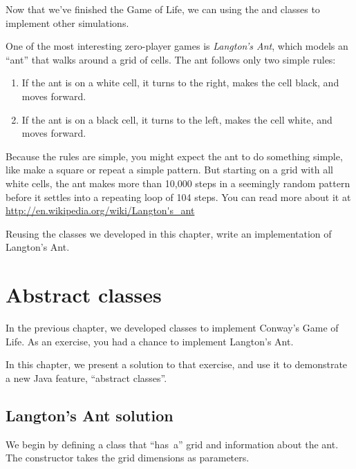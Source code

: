 \begin{exercise}

Now that we've finished the Game of Life, we can 
using the  and  classes to
implement other simulations.

One of the most interesting zero-player games is {\it Langton's Ant}, which models an ``ant'' that walks around a grid of cells.
The ant follows only two simple rules:

\begin{enumerate}
\item If the ant is on a white cell, it turns to the right, makes the cell black, and moves forward.
\item If the ant is on a black cell, it turns to the left, makes the cell white, and moves forward.
\end{enumerate}

Because the rules are simple, you might expect the ant to do something simple, like make a square or repeat a simple pattern.
But starting on a grid with all white cells, the ant makes more than 10,000 steps in a seemingly random pattern before it settles into a repeating loop of 104 steps.
You can read more about it at \url{http://en.wikipedia.org/wiki/Langton's_ant}

Reusing the classes we developed in this chapter, write an implementation of Langton's Ant.

\end{exercise}



\chapter{Abstract classes}

In the previous chapter, we developed classes to implement Conway's Game of Life.
As an exercise, you had a chance to implement Langton's Ant.

In this chapter, we present a solution to that exercise, and use it to demonstrate a new Java feature, ``abstract classes''.

\section{Langton's Ant solution}

We begin by defining a  class that ``has~a'' grid and information about the ant.
The constructor takes the grid dimensions as parameters.

